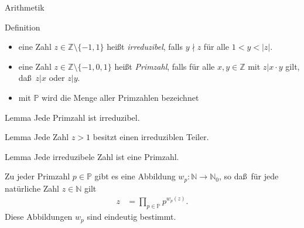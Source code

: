 \documentclass[aspectratio=1610, 11pt]{beamer}
\newcommand\NN{\mathbb N}
\newcommand\ZZ{\mathbb Z}
\newcommand\PP{\mathbb P}
\begin{document}
\begin{frame}{Arithmetik}
	\begin{overprint}
		\begin{block}{Definition}
			\begin{itemize}
				\item eine Zahl $z\in\ZZ\setminus\{-1,1\}$ hei\ss t {\em irreduzibel}, falls $y\nmid z$ f\"ur alle $1<y<|z|$.
				\item eine Zahl $z\in\ZZ\setminus\{-1,0,1\}$ hei\ss t {\em Primzahl}, falls f\"ur alle $x,y\in\ZZ$ mit $z|x\cdot y$ gilt, da\ss\ $z|x$ oder $z|y$.
				\item mit $\PP$ wird die Menge aller Primzahlen bezeichnet
			\end{itemize}
		\end{block}
		\begin{block}{Lemma}
			Jede Primzahl ist irreduzibel.
		\end{block}
		\begin{block}{Lemma}
			Jede Zahl $z>1$ besitzt einen irreduziblen Teiler.
		\end{block}
		\begin{block}{Lemma}
			Jede irreduzibele Zahl ist eine Primzahl.
		\end{block}
		\begin{theorem}
			Zu jeder Primzahl $p\in\PP$ gibt es eine Abbildung $w_p:\NN\to\NN_0$, so da\ss\ f\"ur jede nat\"urliche Zahl $z\in\NN$ gilt
			\begin{align*}
				z&=\prod_{p\in\PP}p^{w_p(z)}.
			\end{align*}
			Diese Abbildungen $w_p$ sind eindeutig bestimmt.
		\end{theorem}
	\end{overprint}
\end{frame}
\end{document}
